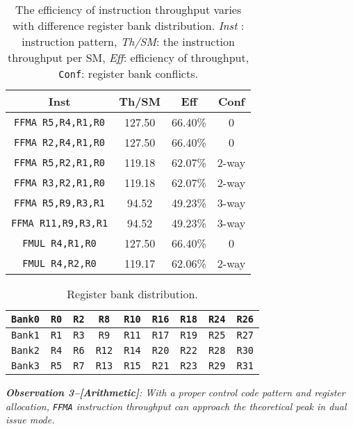 \begin{table}[htbp]
    \caption{The efficiency of instruction throughput varies with difference register bank distribution. {\it Inst} : 
instruction pattern, {\it Th/SM}: the instruction throughput per SM, {\it Eff}: efficiency of throughput, {\tt Conf}: register bank conflicts.}
\centering
\scalebox{1.0} {
\begin{tabular}{|c|c|c|c|}
\hline
Inst &Th/SM&Eff&Conf\\
\hline
{\tt FFMA R5,R4,R1,R0}&127.50&66.40\%&0\\
\hline
{\tt FFMA R2,R4,R1,R0}&127.50&66.40\%&0\\
\hline
{\tt FFMA R5,R2,R1,R0}&119.18&62.07\%&2-way\\
\hline
{\tt FFMA R3,R2,R1,R0}&119.18&62.07\%&2-way\\
\hline
{\tt FFMA R5,R9,R3,R1}&94.52&49.23\%&3-way\\
\hline
{\tt FFMA R11,R9,R3,R1}&94.52&49.23\%&3-way\\
\hline
{\tt FMUL R4,R1,R0}&127.50&66.40\%&0\\
\hline
{\tt FMUL R4,R2,R0}&119.17&62.06\%&2-way\\
\hline
\end{tabular}
}
\label{tab:th}
\end{table}


\begin{table}[htbp]
\caption{Register bank distribution.}
\centering
\scalebox{1.0} {
\begin{tabular}{|c|c|c|c|c|c|c|c|c|}
\hline
    {\tt Bank0}&{\tt R0}&{\tt R2}&{\tt R8}&{\tt R10}&{\tt R16}&{\tt R18}&{\tt R24}&{\tt R26}\\
\hline
    {\tt Bank1}&{\tt R1}&{\tt R3}&{\tt R9}&{\tt R11}&{\tt R17}&{\tt R19}&{\tt R25}&{\tt R27} \\
\hline
    {\tt Bank2}&{\tt R4}&{\tt R6}&{\tt R12}&{\tt R14}&{\tt R20}&{\tt R22}&{\tt R28}&{\tt R30}\\
\hline
    {\tt Bank3}&{\tt R5}&{\tt R7}&{\tt R13}&{\tt R15}&{\tt R21}&{\tt R23}&{\tt R29}&{\tt R31}\\
\hline
\end{tabular}
}
\label{tab:reg}
\end{table}

{\em {\bf Observation 3--[Arithmetic]}: 
With a proper control code pattern and register allocation, {\tt FFMA} 
instruction throughput can approach the theoretical peak in dual issue mode.}

